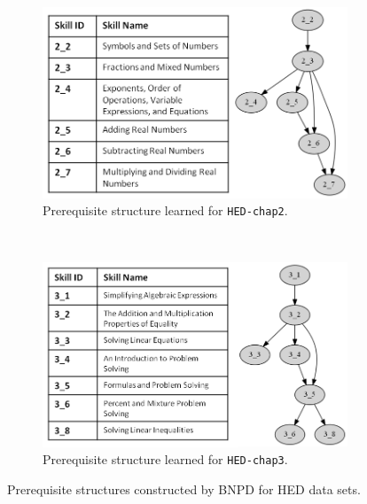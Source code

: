 \documentclass{edm_template}
\begin{document}
{%

	\begin{figure}[!ht]
		\centering
		\begin{subfigure}[b]{0.9\linewidth}
			\centering
			\includegraphics[width=0.9\linewidth]{figures/hed_chap2_structure_prob2.png}
			\caption{Prerequisite structure learned for \texttt{HED-chap2}.}
			\label{fig:hed_chap2_structure}
		\end{subfigure}\\
		\begin{subfigure}[b]{0.9\linewidth}
			\centering
			\includegraphics[width=0.9\linewidth]{figures/hed_chap3_structure_prob2.png}
			\caption{Prerequisite structure learned for \texttt{HED-chap3}.}
			\label{fig:hed_chap3_structure}
		\end{subfigure}%
		\caption{Prerequisite structures constructed by BNPD for HED data sets.}
		\label{fig:hed-structures} 
	\end{figure}			
	
}
\end{document}
